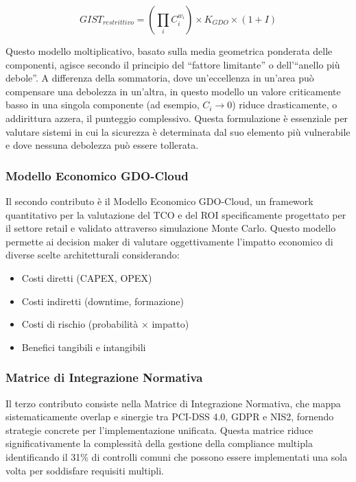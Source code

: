 \begin{equation}
GIST_{restrittivo} = \left(\prod_{i} C_i^{w_i}\right) \times K_{GDO} \times (1+I)
\end{equation}

Questo modello moltiplicativo, basato sulla media geometrica ponderata delle componenti, agisce secondo il principio del ``fattore limitante'' o dell'``anello più debole''. A differenza della sommatoria, dove un'eccellenza in un'area può compensare una debolezza in un'altra, in questo modello un valore criticamente basso in una singola componente (ad esempio, $C_i \to 0$) riduce drasticamente, o addirittura azzera, il punteggio complessivo. Questa formulazione è essenziale per valutare sistemi in cui la sicurezza è determinata dal suo elemento più vulnerabile e dove nessuna debolezza può essere tollerata.

\subsubsection{Modello Economico GDO-Cloud}

Il secondo contributo è il Modello Economico GDO-Cloud, un framework quantitativo per la valutazione del TCO e del ROI specificamente progettato per il settore retail e validato attraverso simulazione Monte Carlo. Questo modello permette ai decision maker di valutare oggettivamente l'impatto economico di diverse scelte architetturali considerando:
\begin{itemize}
\item Costi diretti (CAPEX, OPEX)
\item Costi indiretti (downtime, formazione)
\item Costi di rischio (probabilità × impatto)
\item Benefici tangibili e intangibili
\end{itemize}

\subsubsection{Matrice di Integrazione Normativa}

Il terzo contributo consiste nella Matrice di Integrazione Normativa, che mappa sistematicamente overlap e sinergie tra PCI-DSS 4.0, GDPR e NIS2, fornendo strategie concrete per l'implementazione unificata. Questa matrice riduce significativamente la complessità della gestione della compliance multipla identificando il 31\% di controlli comuni che possono essere implementati una sola volta per soddisfare requisiti multipli.

